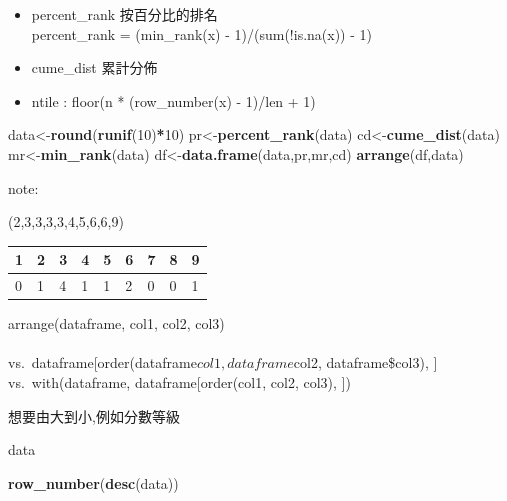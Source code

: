 \documentclass[]{book}
\newenvironment{Shaded}{\begin{snugshade}}{\end{snugshade}}
\newcommand{\DecValTok}[1]{\textcolor[rgb]{0.00,0.00,0.81}{#1}}
\newcommand{\KeywordTok}[1]{\textcolor[rgb]{0.13,0.29,0.53}{\textbf{#1}}}
\newcommand{\NormalTok}[1]{#1}
\newcommand{\OperatorTok}[1]{\textcolor[rgb]{0.81,0.36,0.00}{\textbf{#1}}}
\theoremstyle{definition}
\theoremstyle{definition}
\theoremstyle{definition}
\theoremstyle{remark}
\begin{document}
\begin{itemize}
\item
  percent\_rank 按百分比的排名\\
  percent\_rank = (min\_rank(x) - 1)/(sum(!is.na(x)) - 1)\\
\item
  cume\_dist 累計分佈
\item
  ntile : floor(n * (row\_number(x) - 1)/len + 1)
\end{itemize}

\begin{Shaded}
\begin{Highlighting}[]
\NormalTok{data<-}\KeywordTok{round}\NormalTok{(}\KeywordTok{runif}\NormalTok{(}\DecValTok{10}\NormalTok{)}\OperatorTok{*}\DecValTok{10}\NormalTok{)}
\NormalTok{pr<-}\KeywordTok{percent_rank}\NormalTok{(data)}
\NormalTok{cd<-}\KeywordTok{cume_dist}\NormalTok{(data)}
\NormalTok{mr<-}\KeywordTok{min_rank}\NormalTok{(data)}
\NormalTok{df<-}\KeywordTok{data.frame}\NormalTok{(data,pr,mr,cd)}
\KeywordTok{arrange}\NormalTok{(df,data)}
\end{Highlighting}
\end{Shaded}

note:

(2,3,3,3,3,4,5,6,6,9)

\begin{longtable}[]{@{}lllllllll@{}}
\toprule
1 & 2 & 3 & 4 & 5 & 6 & 7 & 8 & 9\tabularnewline
\midrule
\endhead
0 & 1 & 4 & 1 & 1 & 2 & 0 & 0 & 1\tabularnewline
\bottomrule
\end{longtable}

arrange(dataframe, col1, col2, col3)\\
~\\
vs.~dataframe{[}order(dataframe\(col1, dataframe\)col2,
dataframe\$col3), {]}\\
vs.~with(dataframe, dataframe{[}order(col1, col2, col3), {]})

想要由大到小,例如分數等級

\begin{Shaded}
\begin{Highlighting}[]
\NormalTok{data}
\end{Highlighting}
\end{Shaded}

\begin{Shaded}
\begin{Highlighting}[]
\KeywordTok{row_number}\NormalTok{(}\KeywordTok{desc}\NormalTok{(data))}
\end{Highlighting}
\end{Shaded}
\end{document}
